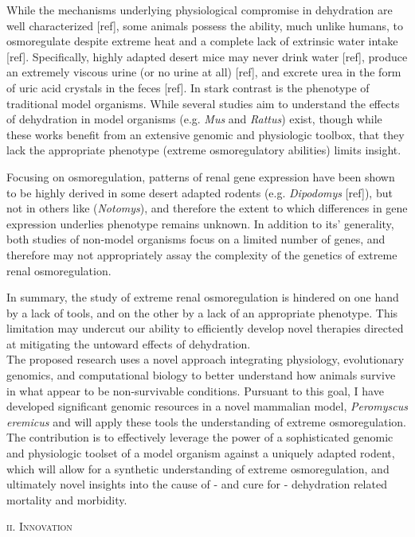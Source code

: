 \documentclass[11pt]{article}
\begin{document}
While the mechanisms underlying physiological compromise in dehydration are well characterized [ref], some animals possess the ability, much unlike humans, to osmoregulate despite extreme heat and a complete lack of extrinsic water intake [ref]. Specifically, highly adapted desert mice may never drink water [ref], produce an extremely viscous urine (or no urine at all) [ref], and excrete urea in the form of uric acid crystals in the feces [ref]. In stark contrast is the phenotype of traditional model organisms. While several studies aim to understand the effects of dehydration in model organisms (e.g. \textit{Mus} and \textit{Rattus}) exist, though while these works benefit from an extensive genomic and physiologic toolbox, that they lack the appropriate phenotype (extreme osmoregulatory abilities) limits insight. 


Focusing on osmoregulation, patterns of renal gene expression have been shown to be highly derived in some desert adapted rodents (e.g. \textit{Dipodomys} [ref]), but not in others like (\textit{Notomys}), and therefore the extent to which differences in gene expression underlies phenotype remains unknown. In addition to its' generality, both studies of non-model organisms focus on a limited number of genes, and therefore may not appropriately assay the complexity of the genetics of extreme renal osmoregulation. 


In summary, the study of extreme renal osmoregulation is hindered on one hand by a lack of tools, and on the other by a lack of an appropriate phenotype. This limitation may undercut our ability to efficiently develop novel therapies directed at mitigating the untoward effects of dehydration. \\

The proposed research uses a novel approach integrating physiology, evolutionary genomics, and computational biology to better understand how animals survive in what appear to be non-survivable conditions. Pursuant to this goal, I have developed significant genomic resources in a novel mammalian model, \textit{Peromyscus eremicus} and will apply these tools the understanding of extreme osmoregulation. The contribution is to effectively leverage the power of a sophisticated genomic and physiologic toolset of a model organism against a uniquely adapted rodent, which will allow for a synthetic understanding of extreme osmoregulation, and ultimately novel insights into the cause of - and cure for - dehydration related mortality and morbidity.
\normalsize 
\begin{center}
\textsc{{ii. Innovation}} \\
\end{center}
\end{document}

